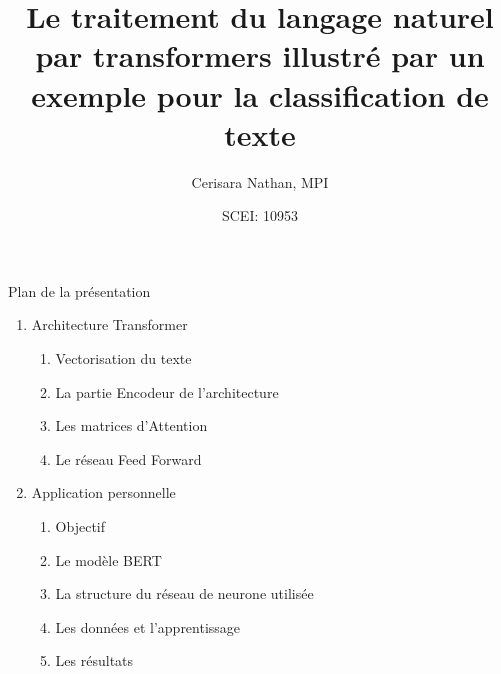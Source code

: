 \documentclass[12pt]{beamer}
\title{Le traitement du langage naturel par transformers illustré par un exemple pour la classification de texte}
\author{Cerisara Nathan, MPI}
\date{SCEI: 10953}
\begin{document}
\maketitle


\begin{frame}{Plan de la présentation}

\begin{enumerate}
  \item Architecture Transformer
  	\begin{enumerate}
  		\item Vectorisation du texte
  		\item La partie Encodeur de l'architecture
  		\item Les matrices d'Attention
  		\item Le réseau Feed Forward
  	\end{enumerate}
  \vspace{7px}
  \item Application personnelle
     \begin{enumerate}
      		\item Objectif
      		\item Le modèle BERT
      		\item La structure du réseau de neurone utilisée
      		\item Les données et l'apprentissage
      		\item Les résultats
     \end{enumerate}
\end{enumerate}

\end{frame}

\end{document}
